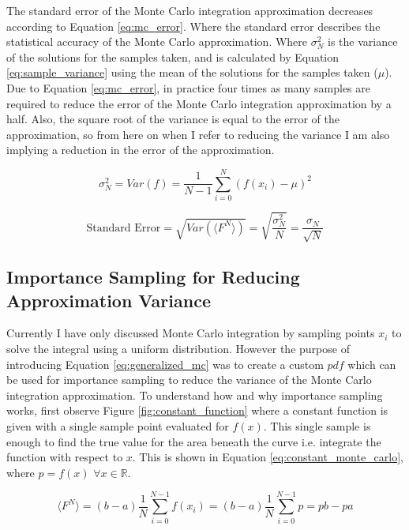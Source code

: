 \documentclass[ %
                    author={Callum Pearce},
                supervisor={Dr. Neill Campbell},
                    degree={MEng},
                     title={How effective are Temporal difference learning methods for reducing the number of zero contribution light paths while still accurately approximating Global Illumination in Path tracing?},
                  subtitle={},
                      type={research},
                      year={2019} ]{dissertation}
\begin{document}
The standard error of the Monte Carlo integration approximation decreases according to Equation \ref{eq:mc_error}. Where the standard error describes the statistical accuracy of the Monte Carlo approximation. Where $\sigma_N^2$ is the variance of the solutions for the samples  taken, and is calculated by Equation \ref{eq:sample_variance} using the mean of the solutions for the samples taken ($\mu$). Due to Equation \ref{eq:mc_error}, in practice four times as many samples are required to reduce the error of the Monte Carlo integration approximation by a half. Also, the square root of the variance  is equal to the error of the approximation, so from here on when I refer to reducing the variance I am also implying a reduction in the error of the approximation.

\begin{equation}
\label{eq:sample_variance}
\sigma_N^2 = Var(f) = \frac{1}{N-1} \sum_{i=0}^N (f(x_i) - \mu)^2
\end{equation}

\begin{equation}
\label{eq:mc_error}
\text{Standard Error} = \sqrt{Var(\langle F^N \rangle)} = \sqrt{\frac{\sigma_N^2}{N}} = \frac{\sigma_N}{\sqrt{N}}
\end{equation}

\subsection{Importance Sampling for Reducing Approximation Variance}
\label{sec:importance_smapling}

Currently I have only discussed Monte Carlo integration by sampling points $x_i$ to solve the integral using a uniform distribution. However the purpose of introducing Equation \ref{eq:generalized_mc} was to create a custom $pdf$ which can be used for importance sampling to reduce the variance of the Monte Carlo integration approximation. To understand how and why importance sampling works, first observe Figure \ref{fig:constant_function} where a constant function is given with a single sample point evaluated for $f(x)$. This single sample is enough to find the true value for the area beneath the curve i.e. integrate the function with respect to $x$. This is shown in Equation \ref{eq:constant_monte_carlo}, where $p = f(x)$ $ \forall x \in \mathbb{R}$.

\begin{equation}
\label{eq:constant_monte_carlo}
\langle F^N \rangle = (b - a) \frac{1}{N} \sum^{N-1}_{i=0} f(x_i) = (b - a)  \frac{1}{N} \sum^{N-1}_{i=0} p = pb - pa
\end{equation}
\end{document}
